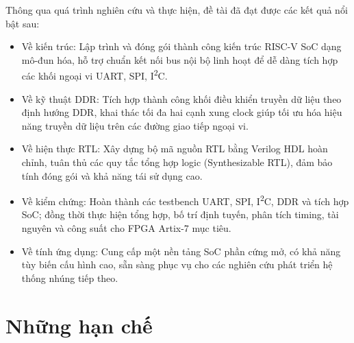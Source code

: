 Thông qua quá trình nghiên cứu và thực hiện, đề tài đã đạt được các kết quả nổi bật sau:
\begin{itemize}
    \item Về kiến trúc: Lập trình và đóng gói thành công kiến trúc RISC-V SoC dạng mô-đun hóa, hỗ trợ chuẩn kết nối bus nội bộ linh hoạt để dễ dàng tích hợp các khối ngoại vi UART, SPI, I\textsuperscript{2}C.
    \item Về kỹ thuật DDR: Tích hợp thành công khối điều khiển truyền dữ liệu theo định hướng DDR, khai thác tối đa hai cạnh xung clock giúp tối ưu hóa hiệu năng truyền dữ liệu trên các đường giao tiếp ngoại vi.
    \item Về hiện thực RTL: Xây dựng bộ mã nguồn RTL bằng Verilog HDL hoàn chỉnh, tuân thủ các quy tắc tổng hợp logic (Synthesizable RTL), đảm bảo tính đóng gói và khả năng tái sử dụng cao.
    \item Về kiểm chứng: Hoàn thành các testbench UART, SPI, I\textsuperscript{2}C, DDR và tích hợp SoC; đồng thời thực hiện tổng hợp, bố trí định tuyến, phân tích timing, tài nguyên và công suất cho FPGA Artix-7 mục tiêu.
    \item Về tính ứng dụng: Cung cấp một nền tảng SoC phần cứng mở, có khả năng tùy biến cấu hình cao, sẵn sàng phục vụ cho các nghiên cứu phát triển hệ thống nhúng tiếp theo.
\end{itemize}

\section{Những hạn chế}

